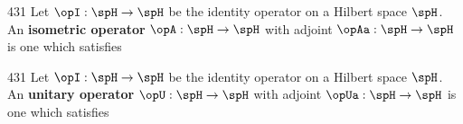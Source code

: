 \begin{definition}
\citep{michel}{431}
Let $\opI:\spH\to\spH$ be the identity operator on a Hilbert space $\spH$.
An {\bf isometric operator} $\opA:\spH\to\spH$ with 
adjoint $\opAa:\spH\to\spH$ is one which satisfies
\end{definition}

\begin{definition}
\citep{michel}{431}
Let $\opI:\spH\to\spH$ be the identity operator on a Hilbert space $\spH$.
An {\bf unitary operator} $\opU:\spH\to\spH$ with 
adjoint $\opUa:\spH\to\spH$ is one which satisfies
\end{definition}


